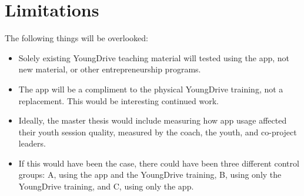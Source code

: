 \section{Limitations}

The following things will be overlooked:
\begin{itemize}
\item Solely existing YoungDrive teaching material will tested using the app, not new material, or other entrepreneurship programs.
\item The app will be a compliment to the physical YoungDrive training, not a replacement. This would be interesting continued work.
\item Ideally, the master thesis would include measuring how app usage affected their youth session quality, measured by the coach, the youth, and co-project leaders.
\item If this would have been the case, there could have been three different control groups: A, using the app and the YoungDrive training, B, using only the YoungDrive training, and C, using only the app.
\end{itemize}
